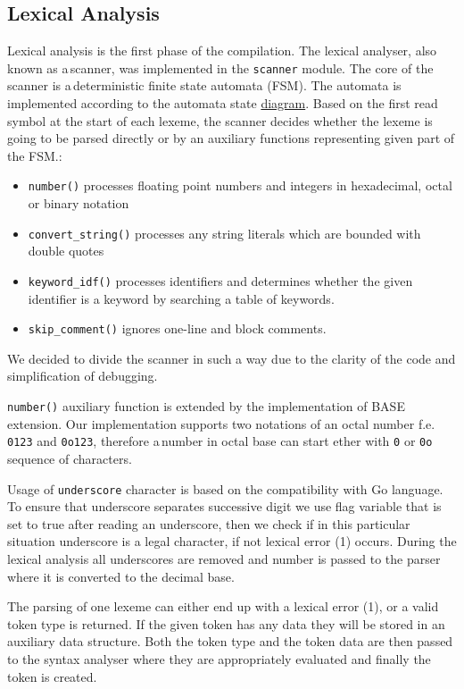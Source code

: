 \documentclass[12pt]{article}
\begin{document}
\subsection{Lexical Analysis}
\label{sec:lexanalyser}
	Lexical analysis is the first phase of the compilation. The lexical analyser, also known as a\,scanner, was implemented in the \texttt{scanner} module. The core of the scanner is a\,deterministic finite state automata (FSM). The automata is implemented according to the automata state \hyperref[figure:fsm]{diagram}. Based on the first read symbol	at the start of each lexeme, the scanner decides whether the lexeme is going to be parsed directly or by an auxiliary functions representing given part of the FSM.:\par
		\begin{itemize}
 			 \item \texttt{number()} processes floating point numbers and integers in hexadecimal, octal or binary notation
			 \item \texttt{convert\_string()} processes any string literals which are bounded with double quotes
			 \item \texttt{keyword\_idf()} processes identifiers and determines whether the given identifier is a keyword by searching a table of keywords.
			 \item \texttt{skip\_comment()} ignores one-line and block comments.
		\end{itemize}\par
We decided to divide the scanner in such a way due to the clarity of the code and simplification of debugging. \par
	\texttt{number()} auxiliary function is extended by the implementation of  BASE extension. Our implementation supports two notations of an octal number f.e. \texttt{0123} and \texttt{0o123}, therefore a\,number in octal base can start ether with \texttt{0} or \texttt{0o} sequence of characters.\par
Usage of \texttt{underscore} character is based on the compatibility with Go language. To ensure that underscore separates successive digit we use flag variable that is set to true after reading an underscore, then we check if in this particular situation underscore is a legal character, if not lexical error (1) occurs. During the lexical analysis all underscores are removed and number is passed to the parser where it is converted to the decimal base.\par
The parsing of one lexeme can either end up with a lexical error (1), or a valid token type is returned. If the given token has any data they will be stored in an auxiliary data structure. Both the token type and the token data are then passed to the syntax analyser where they are appropriately evaluated and finally the token is created.
\end{document}

